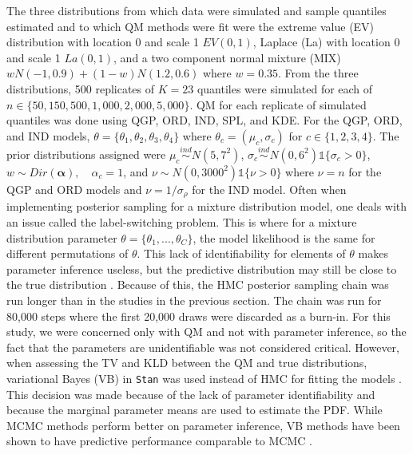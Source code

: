 The three distributions from which data were simulated and sample quantiles 
estimated and to which QM methods were fit were the extreme value (EV) 
distribution with location 0 and scale 1 $EV(0,1)$, Laplace (La) with location 
0 and scale 1 $La(0,1)$, and a two component normal mixture (MIX) 
$w N(-1, 0.9) + (1-w)N(1.2, 0.6)$ where $w = 0.35$. From the three 
distributions, 500 replicates of $K = 23$ quantiles were simulated for each of 
$n \in \{50, 150, 500, 1{,}000, 2{,}000, 5{,}000\}$. QM for each replicate of 
simulated quantiles was done using QGP, ORD, IND, SPL, and KDE. For the QGP, 
ORD, and IND models, $\theta = \{\theta_1, \theta_2, \theta_3, \theta_4\}$ 
where $\theta_c = (\mu_c, \sigma_c)$ for $c \in \{1,2,3,4\}$. The prior 
distributions assigned were $\mu_c \overset{ind}{\sim} N(5, 7^2)$,
$\sigma_c \overset{ind}{\sim} N(0, 6^2)\mathds{1}\{\sigma_c > 0\}$,
$w \sim Dir(\boldsymbol{\alpha}), \quad \alpha_c = 1$, and
$\nu \sim N(0, 3000^2)\mathds{1}\{\nu > 0\}$
where $\nu = n$ for the QGP and ORD models 
and $\nu = 1/\sigma_{\rho}$ for the IND model. 
Often when implementing posterior sampling for a mixture distribution model, 
one deals with an issue called the label-switching problem. This is where for a
mixture distribution parameter $\theta = \{\theta_1,...,\theta_C\}$, the model 
likelihood is the same for different permutations of $\theta$. This lack of 
identifiability for elements of $\theta$ makes parameter inference useless, 
but the predictive distribution may still be close to the true distribution 
\cite[]{stephens2000dealing}.
Because of this, the HMC posterior sampling chain was run longer than in the 
studies in the previous section. The chain was run for 80,000 steps where the 
first 20,000 draws were discarded as a burn-in. For this study, we were 
concerned only with QM and not with parameter inference, so the fact that the 
parameters are unidentifiable was not considered critical. However, when 
assessing the TV and KLD between the QM and true distributions, variational 
Bayes (VB) in \texttt{Stan} was used instead of HMC for fitting the models 
\cite[]{kucukelbir2015automatic}. This decision was made because of the lack of 
parameter identifiability and because the marginal parameter means are used to 
estimate the PDF. While MCMC methods perform better on parameter inference, 
VB methods have been shown to have predictive performance comparable to MCMC 
\cite[]{blei2017variational}.



